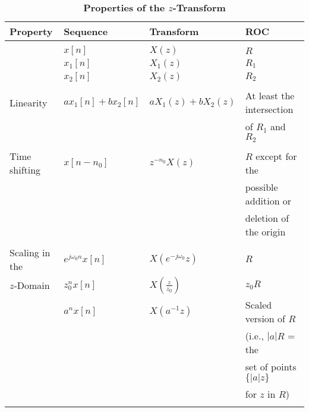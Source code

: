 \documentclass[12pt]{article}
\numberwithin{equation}{section}
\begin{document}
\begin{table}[htbp]
\begin{center}
\vspace*{-1.0in}
\caption{\bf Properties of the $z$-Transform}
\hspace*{-1.0in}
\begin{tabular}{llll} \hline
Property & Sequence  & Transform & ROC \\ \hline
\\
         & $x[n]$      & $X(z)$      & $R$ \\
         & $x_1[n]$    & $X_1(z)$    & $R_1$ \\
         & $x_2[n]$    & $X_2(z)$    & $R_2$ \\

\\
Linearity     & $ax_1[n] + bx_2[n]$
          & $aX_1(z) + b X_2(z)$
           & At least the intersection\\
           & & &of $R_1$ and $R_2$\\

\\

Time shifting  & $x[n - n_0] $ &  $z^{-n_0} X(z)$ & $R$ except for the\\
                                & & & possible addition or \\
                               &  & & deletion of the origin\\

\\

Scaling in the   & $e^{j\omega_0 n} x[n]$ & $X(e^{-j\omega _0} z)$ & $R$ \\
$z$-Domain        & $z_0^n x[n]$  & $ X\left(\frac{z}{z_0}\right)$ & $z_0 R$ \\
        & $ a^n x[n] $   & $ X(a^{-1}z) $ & Scaled version of $R$ \\
                & & &  (i.e., $|a|  R $ = the \\
                & & &   set of points $\{|a|z\}$ \\
                & & &   for $z$ in $R$)\\
\\


\end{tabular}
\end{center}
\end{table}
\end{document}
